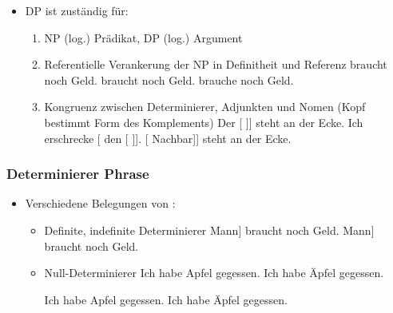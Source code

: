 \begin{frame}

\begin{itemize}
\item DP ist zuständig für:

	\begin{enumerate}
		\item NP \ras (log.) Prädikat, DP \ras (log.) Argument 
		\eal 
		\zl

\pause
	
		\item Referentielle Verankerung der NP in Definitheit und Referenz
		\eal
		\ex {} braucht noch Geld.
		\ex {} braucht noch Geld.
		\ex {} brauche noch Geld.
		\zl

\pause

		\item Kongruenz zwischen Determinierer, Adjunkten und Nomen (Kopf bestimmt Form des Komplements)
		\eal 
		\ex {[} Der [ ]{]} steht an der Ecke.
		\ex Ich erschrecke [ den [ ]].
		\ex {[}  [  Nachbar]{]} steht an der Ecke.
		\zl

	\end{enumerate}		

\end{itemize}			

\end{frame}


\begin{frame}
\frametitle{Determinierer Phrase}

\begin{itemize}
	\item Verschiedene Belegungen von :
	\begin{itemize}
		\item Definite, indefinite Determinierer
		\eal
		\ex {[}  Mann] braucht noch Geld.
		\ex {[}  Mann] braucht noch Geld.
		\zl

\pause		
		\item Null-Determinierer \citep[aber vgl.][]{Loebner86a}
		\eal 
		\ex Ich habe  Apfel gegessen.
		\ex Ich habe  Äpfel gegessen.
		\zl			

\pause		
		\eal
		\ex Ich habe  Apfel gegessen.
		\ex Ich habe \alertred{$\emptyset$} Äpfel gegessen.
		\zl			
		
	\end{itemize}
\end{itemize}

\end{frame}


